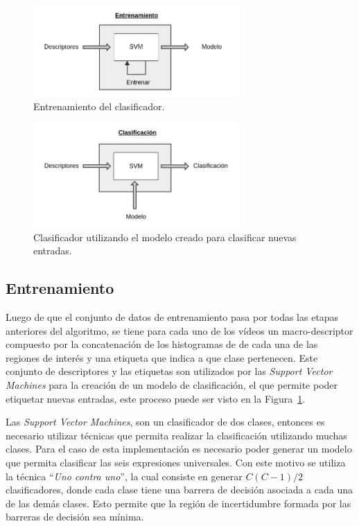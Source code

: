 	\begin{figure}[bt]
		\centering
    		\includegraphics[width=0.7\textwidth]{Figuras/Diagramas/Entrenamiento.png}
  		\caption{Entrenamiento del clasificador.}
  		\label{algoritmo:fig:entrenamiento}
	\end{figure}	
	
	\begin{figure}[bt]
		\centering
    		\includegraphics[width=0.7\textwidth]{Figuras/Diagramas/Clasificacion.png}
  		\caption{Clasificador utilizando el modelo creado para clasificar nuevas entradas.}
  		\label{algoritmo:fig:clasificacion}
	\end{figure}	
		
	


	\subsection{Entrenamiento}
	\label{algoritmo:entrenamiento}
		Luego de que el conjunto de datos de entrenamiento pasa por todas las etapas anteriores del algoritmo, se tiene para cada uno de los vídeos un macro-descriptor compuesto por la concatenación de los histogramas de de cada una de las regiones de interés y una etiqueta que indica a que clase pertenecen. Este conjunto de descriptores y las etiquetas son utilizados por las \textit{Support Vector Machines} para la creación de un modelo de clasificación, el que permite poder etiquetar nuevas entradas, este proceso puede ser visto en la Figura~\ref{algoritmo:fig:entrenamiento}.
	
	Las \textit{Support Vector Machines}, son un clasificador de dos clases, entonces es necesario utilizar técnicas que permita realizar la clasificación utilizando muchas clases. Para el caso de esta implementación es necesario poder generar un modelo que permita clasificar las seis expresiones universales. Con este motivo se utiliza la técnica ``\textit{Uno contra uno}'', la cual consiste en generar $C(C-1)/2$ clasificadores, donde cada clase tiene una barrera de decisión asociada a cada una de las demás clases. Esto permite que la región de incertidumbre formada por las barreras de decisión sea mínima.
			
